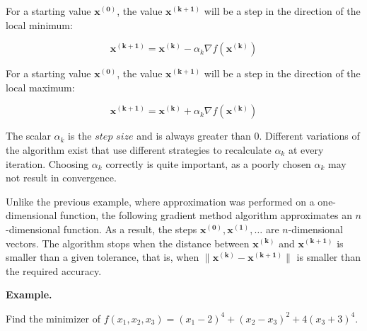 \documentclass[11pt]{article}
\begin{document}
For a starting value \(\pmb{x^{(0)}}\), the value \(\pmb{x^{(k+1)}}\)
will be a step in the direction of the local minimum:

\[
\pmb{x^{(k+1)}} = \pmb{x^{(k)}} - \alpha_k \nabla f(\pmb{x^{(k)}})
\]

For a starting value \(\pmb{x^{(0)}}\), the value \(\pmb{x^{(k+1)}}\)
will be a step in the direction of the local maximum:

\[
\pmb{x^{(k+1)}} = \pmb{x^{(k)}} + \alpha_k \nabla f(\pmb{x^{(k)}})
\]

The scalar \(\alpha_k\) is the \(\textit{step size}\) and is always
greater than 0. Different variations of the algorithm exist that use
different strategies to recalculate \(\alpha_k\) at every iteration.
Choosing \(\alpha_k\) correctly is quite important, as a poorly chosen
\(\alpha_k\) may not result in convergence.

Unlike the previous example, where approximation was performed on a
one-dimensional function, the following gradient method algorithm
approximates an \(n\)-dimensional function. As a result, the steps
\(\pmb{x^{(0)}}, \pmb{x^{(1)}}, \ldots\) are \(n\)-dimensional vectors.
The algorithm stops when the distance between \(\pmb{x^{(k)}}\) and
\(\pmb{x^{(k+1)}}\) is smaller than a given tolerance, that is, when
\(\| \pmb{x^{(k)}} - \pmb{x^{(k+1)}} \|\) is smaller than the required
accuracy.

\textbf{Example.}

Find the minimizer of
\(f(x_1, x_2, x_3) = (x_1 - 2)^4 + (x_2 - x_3)^2 + 4(x_3 + 3)^4\).
\end{document}

